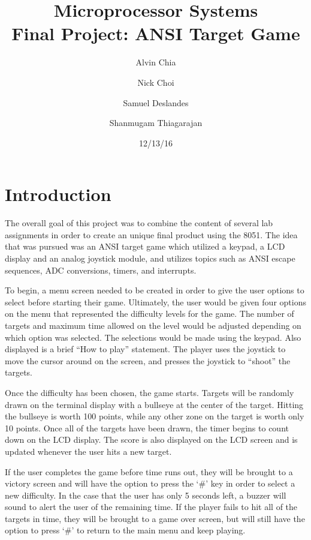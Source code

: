 \documentclass[12pt]{article}
\begin{document}
	\title{Microprocessor Systems\\ Final Project: ANSI Target Game}
	\author{Alvin Chia \and Nick Choi \and Samuel Deslandes \and Shanmugam Thiagarajan}
	\date{12/13/16}
	\maketitle
	\pagebreak
	
	\section{Introduction}
	The overall goal of this project was to combine the content of several lab assignments in order to create an unique final product using the 8051. The idea that was pursued was an ANSI target game which utilized a keypad, a LCD display and an analog joystick module, and utilizes topics such as ANSI escape sequences, ADC conversions, timers, and interrupts. 
	
	To begin, a menu screen needed to be created in order to give the user options to select before starting their game. Ultimately, the user would be given four options on the menu that represented the difficulty levels for the game. The number of targets and maximum time allowed on the level would be adjusted depending on which option was selected. The selections would be made using the keypad. Also displayed is a brief ``How to play'' statement. The player uses the joystick to move the cursor around on the screen, and presses the joystick to ``shoot'' the targets. 
	
	Once the difficulty has been chosen, the game starts. Targets will be randomly drawn on the terminal display with a bullseye at the center of the target. Hitting the bullseye is worth 100 points, while any other zone on the target is worth only 10 points. Once all of the targets have been drawn, the timer begins to count down on the LCD display. The score is also displayed on the LCD screen and is updated whenever the user hits a new target. 
	
	If the user completes the game before time runs out, they will be brought to a victory screen and will have the option to press the ‘\#’ key in order to select a new difficulty. In the case that the user has only 5 seconds left, a buzzer will sound to alert the user of the remaining time. If the player fails to hit all of the targets in time, they will be brought to a game over screen, but will still have the option to press `\#' to return to the main menu and keep playing. 
	
\end{document}
